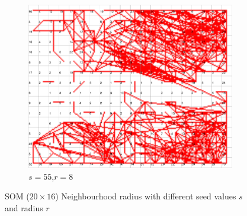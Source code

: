 \documentclass{acm_proc_article-sp}
\begin{document}
\begin{figure}
\begin{subfigure}[b]{0.30\linewidth}
        \label{fig:wine-newmid-radius-neighbourhood-graph--r-08-seed-7}
    \end{subfigure}
    \begin{subfigure}[b]{0.30\linewidth}
        \includegraphics[width=\linewidth]{img/wine-newmid-radius-neighbourhood-graph--r-08-seed-55}
        \caption{$s=55$,$r=8$}
        \label{fig:wine-newmid-radius-neighbourhood-graph--r-08-seed-55}
    \end{subfigure}
    \caption{SOM ($20\times16$) Neighbourhood radius with different seed values $s$ and radius $r$}
    \label{fig:wine-newmid-radius-neighbourhood-graph--r-08-seed}
\end{figure}
\end{document}

